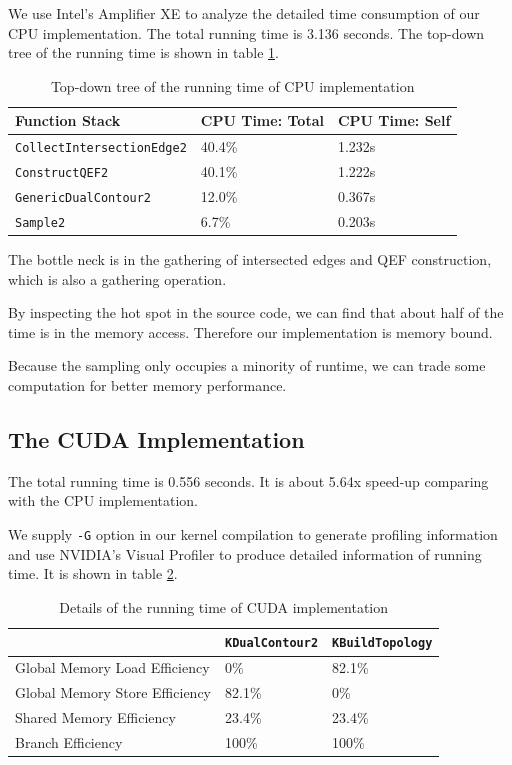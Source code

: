 \documentclass[a4paper,12pt]{article}
\begin{document}
We use Intel's Amplifier XE to analyze the detailed time consumption
of our CPU implementation.
The total running time is 3.136 seconds.
The top-down tree of the running time is shown in table
\ref{tab:dc2-cpu-performance}.

\begin{table}[h]
\centering
\begin{tabular}{| l | l | l |}
\hline
Function Stack & CPU Time: Total & CPU Time: Self\\  \hline
\texttt{CollectIntersectionEdge2} & 40.4\% & 1.232s \\
\texttt{ConstructQEF2} & 40.1\% & 1.222s \\
\texttt{GenericDualContour2} & 12.0\% & 0.367s \\
\texttt{Sample2} & 6.7\% & 0.203s \\
\hline
\end{tabular}
\caption{Top-down tree of the running time of CPU implementation}
\label{tab:dc2-cpu-performance}
\end{table}

The bottle neck is in the gathering of intersected edges and
QEF construction, which is also a gathering operation.

By inspecting the hot spot in the source code,
we can find that about half of the time is in the memory access.
Therefore our implementation is memory bound.

Because the sampling only occupies a minority of runtime,
we can trade some computation for better memory performance.

\subsection{The CUDA Implementation}

The total running time is 0.556 seconds.
It is about 5.64x speed-up comparing with the CPU implementation.

We supply \texttt{-G} option in our kernel compilation to generate
profiling information
and use NVIDIA's Visual Profiler
to produce detailed information of running time.
It is shown in table \ref{tab:cudc2-cuda-performance}.

\begin{table}[h]
\centering
\begin{tabular}{| l | l | l |}
\hline
& \texttt{KDualContour2} & \texttt{KBuildTopology}\\  \hline
Global Memory Load Efficiency & 0\% & 82.1\%\\
Global Memory Store Efficiency & 82.1\% & 0\%\\
Shared Memory Efficiency & 23.4\% & 23.4\%\\
Branch Efficiency & 100\% & 100\%\\
\hline
\end{tabular}
\caption{Details of the running time of CUDA implementation}
\label{tab:cudc2-cuda-performance}
\end{table}
\end{document}
